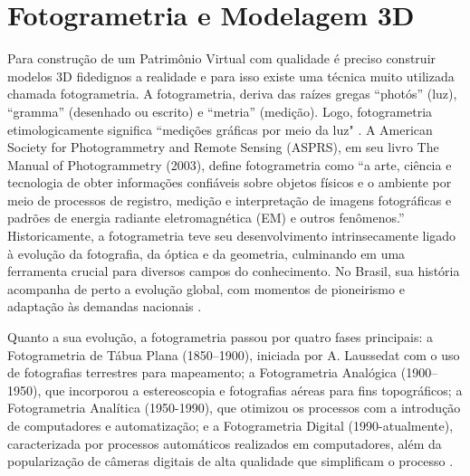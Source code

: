     \section{Fotogrametria e Modelagem 3D}\label{sec:fotogrametria e modelagem 3D}
    Para construção de um Patrimônio Virtual com qualidade é preciso construir modelos 3D fidedignos a realidade e para isso existe uma técnica muito utilizada chamada fotogrametria.
    A fotogrametria, deriva das raízes gregas “photós” (luz), “gramma” (desenhado ou escrito) e “metria” (medição). Logo, fotogrametria etimologicamente significa “medições gráficas por meio da luz" \citep{Paredes1987}. A American Society for Photogrammetry and Remote Sensing (ASPRS), em seu livro The Manual of Photogrammetry (2003), define fotogrametria como “a arte, ciência e tecnologia de obter informações confiáveis sobre objetos físicos e o ambiente por meio de processos de registro, medição e interpretação de imagens fotográficas e padrões de energia radiante eletromagnética (EM) e outros fenômenos.”
    Historicamente, a fotogrametria  teve seu desenvolvimento intrinsecamente ligado à evolução da fotografia, da óptica e da geometria, culminando em uma ferramenta crucial para diversos campos do conhecimento. No Brasil, sua história acompanha de perto a evolução global, com momentos de pioneirismo e adaptação às demandas nacionais \citep{Silva2013}.
    
    Quanto a sua evolução, a fotogrametria passou por quatro fases principais: a Fotogrametria de Tábua Plana (1850–1900), iniciada por A. Laussedat com o uso de fotografias terrestres para mapeamento; a Fotogrametria Analógica (1900–1950), que incorporou a estereoscopia e fotografias aéreas para fins topográficos; a Fotogrametria Analítica (1950-1990), que otimizou os processos com a introdução de computadores e automatização; e a Fotogrametria Digital (1990-atualmente), caracterizada por processos automáticos realizados em computadores, além da popularização de câmeras digitais de alta qualidade que simplificam o processo \citep{Silva2013}.
    
